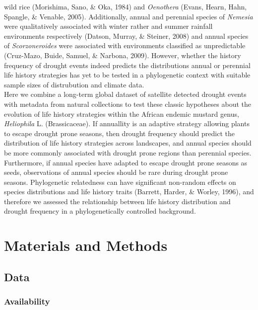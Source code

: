 \documentclass[man,floatsintext]{apa6}
\theoremstyle{definition}
\theoremstyle{definition}
\theoremstyle{definition}
\theoremstyle{remark}
\begin{document}
wild rice (Morishima, Sano, \& Oka, 1984) and \emph{Oenothera} (Evans,
Hearn, Hahn, Spangle, \& Venable, 2005). Additionally, annual and
perennial species of \emph{Nemesia} were qualitatively associated with
winter rather and summer rainfall environments respectively (Datson,
Murray, \& Steiner, 2008) and annual species of \emph{Scorzoneroides}
were associated with environments classified as unpredictable
(Cruz-Mazo, Buide, Samuel, \& Narbona, 2009). However, whether the
history frequency of drought events indeed predicts the distributions
annual or perennial life history strategies has yet to be tested in a
phylogenetic context with suitable sample sizes of distrubution and
climate data.\\
Here we combine a long-term global dataset of satellite detected drought
events with metadata from natural collections to test these classic
hypotheses about the evolution of life history strategies within the
African endemic mustard genus, \emph{Heliophila} L. (Brassicaceae). If
annuallity is an adaptive strategy allowing plants to escape drought
prone seasons, then drought frequency should predict the distribution of
life history strategies across landscapes, and annual species should be
more commonly associated with drought prone regions than perennial
species. Furthermore, if annual species have adapted to escape drought
prone seasons as seeds, observations of annual species should be rare
during drought prone seasons. Phylogenetic relatedness can have
significant non-random effects on species distributions and life history
traits (Barrett, Harder, \& Worley, 1996), and therefore we assessed the
relationship between life history distribution and drought frequency in
a phylogenetically controlled background.

\hypertarget{materials-and-methods}{%
\section{Materials and Methods}\label{materials-and-methods}}

\hypertarget{data}{%
\subsection{Data}\label{data}}

\hypertarget{availability}{%
\subsubsection{Availability}\label{availability}}
\end{document}
